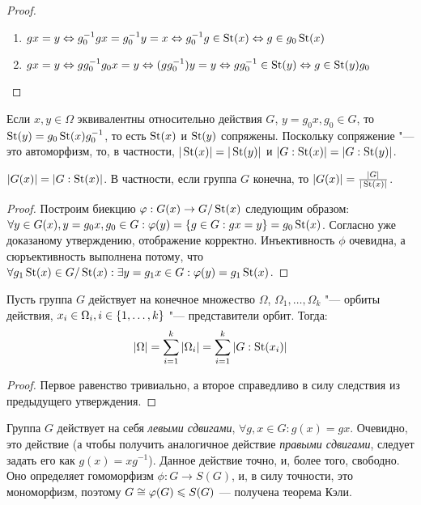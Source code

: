 \begin{proof}~
	\begin{enumerate}
		\item $gx = y \Leftrightarrow g^{-1}_0gx = g^{-1}_0y = x \Leftrightarrow g_0^{-1}g \in \St(x) \hm\Leftrightarrow g \in g_0\St(x)$
		\item $gx \hm= y \Leftrightarrow gg_0^{-1}g_0x = y \Leftrightarrow (gg_0^{-1})y = y \Leftrightarrow gg_0^{-1} \in \St(y) \Leftrightarrow g \hm\in \St(y)g_0$
	\end{enumerate}
\end{proof}

\begin{corollary}
	Если $x, y \in \Omega$ эквивалентны относительно действия $G$, $y = g_0x, g_0 \in G$, то $\operatorname{St}(y) = g_0\operatorname{St}(x)g_0^{-1}$, то есть $\operatorname{St}(x)$ и $\operatorname{St}(y)$ сопряжены. Поскольку сопряжение "--- это автоморфизм, то, в частности, $|\operatorname{St}(x)| = |\operatorname{St}(y)|$ и $|G : \operatorname{St}(x)| = |G : \operatorname{St}(y)|$.
\end{corollary}

\begin{corollary}
	$|G(x)| = |G : \operatorname{St}(x)|$. В частности, если группа $G$ конечна, то $|G(x)| = \frac{|G|}{|\operatorname{St}(x)|}$.
\end{corollary}

\begin{proof}
	Построим биекцию $\varphi: G(x) \to G / \operatorname{St}(x)$ следующим образом: $\forall y \hm\in G(x), y = g_0x, g_0 \in G: \phi(y) = \{g \in G: gx = y\} \hm= g_0\St(x)$. Согласно уже доказаному утверждению, отображение корректно. Инъективность $\phi$ очевидна, а сюръективность выполнена потому, что $\forall g_1\St(x) \in G / \St(x): \exists y = g_1x \in G: \phi(y) \hm= g_1\St(x)$.
\end{proof}

\begin{theorem}
	Пусть группа $G$ действует на конечное множество $\Omega$, $\Omega_1, \dotsc, \Omega_k$ "--- орбиты действия, $x_i \in \Omega_i, i \hm\in \{1, \dotsc, k\}$ "--- представители орбит. Тогда:
	\[|\Omega| = \sum\limits_{i = 1}^k|\Omega_i| = \sum\limits_{i = 1}^k|G : \operatorname{St}(x_i)|\]
\end{theorem}

\begin{proof}
	Первое равенство тривиально, а второе справедливо в силу следствия из предыдущего утверждения.
\end{proof}

\begin{example}
	Группа $G$ действует на себя \textit{левыми сдвигами}, $\forall g, x \in G: g(x) = gx$. Очевидно, это действие (а чтобы получить аналогичное действие \textit{правыми сдвигами}, следует задать его как $g(x) = xg^{-1}$). Данное действие точно, и, более того, свободно. Оно определяет гомоморфизм $\phi: G \to S(G)$, и, в силу точности, это мономорфизм, поэтому $G \cong \phi(G) \hm\le S(G)$ --- получена теорема Кэли.
\end{example}

